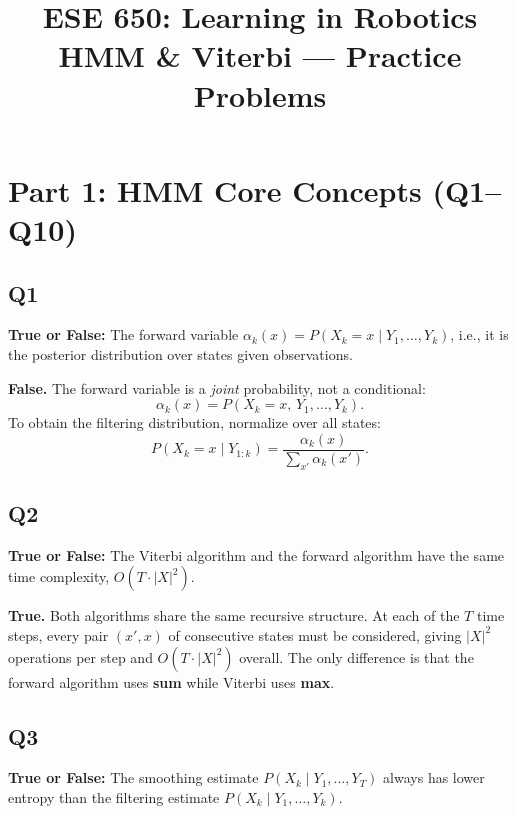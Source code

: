 \documentclass[12pt]{article}
\title{\textbf{ESE 650: Learning in Robotics}\\
\large HMM \& Viterbi --- Practice Problems}
\author{}
\date{}
\begin{document}
\maketitle

\section*{Part 1: HMM Core Concepts (Q1--Q10)}

\subsection*{Q1}
\begin{tcolorbox}[questionbox]
\textbf{True or False:} The forward variable $\alpha_k(x) = P(X_k = x \mid Y_1, \ldots, Y_k)$,
i.e., it is the posterior distribution over states given observations.
\end{tcolorbox}

\begin{tcolorbox}[answerbox]
\textbf{False.} The forward variable is a \emph{joint} probability, not a conditional:
\[
  \alpha_k(x) = P(X_k = x,\, Y_1, \ldots, Y_k).
\]
To obtain the filtering distribution, normalize over all states:
\[
  P(X_k = x \mid Y_{1:k}) = \frac{\alpha_k(x)}{\displaystyle\sum_{x'} \alpha_k(x')}.
\]
\end{tcolorbox}

\subsection*{Q2}
\begin{tcolorbox}[questionbox]
\textbf{True or False:} The Viterbi algorithm and the forward algorithm have the same
time complexity, $O(T \cdot |X|^2)$.
\end{tcolorbox}

\begin{tcolorbox}[answerbox]
\textbf{True.} Both algorithms share the same recursive structure. At each of the $T$
time steps, every pair $(x', x)$ of consecutive states must be considered, giving
$|X|^2$ operations per step and $O(T \cdot |X|^2)$ overall. The only difference is
that the forward algorithm uses \textbf{sum} while Viterbi uses \textbf{max}.
\end{tcolorbox}

\subsection*{Q3}
\begin{tcolorbox}[questionbox]
\textbf{True or False:} The smoothing estimate $P(X_k \mid Y_1, \ldots, Y_T)$ always
has lower entropy than the filtering estimate $P(X_k \mid Y_1, \ldots, Y_k)$.
\end{tcolorbox}
\end{document}
